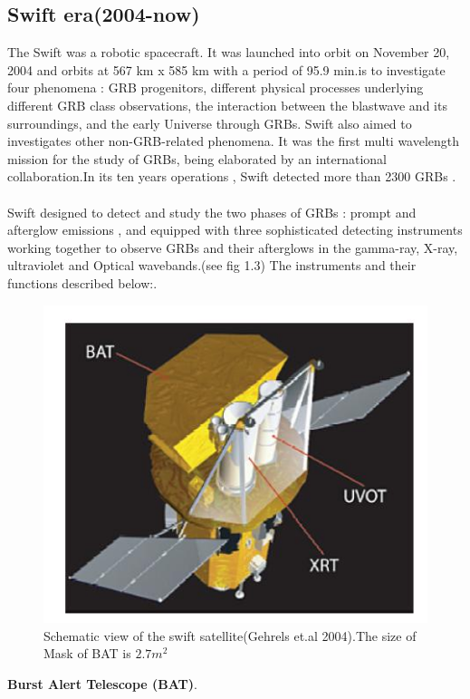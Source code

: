 \subsection{Swift era(2004-now)}
The Swift was a robotic spacecraft. It was launched into orbit on November 20, 2004 
and  orbits at 567 km x 585 km with a period of 95.9 min.is to investigate four phenomena : GRB progenitors, different physical processes underlying different GRB class observations, the interaction between the blastwave and its surroundings, and the early Universe through GRBs. Swift also aimed to investigates other non-GRB-related phenomena. It was the first multi wavelength mission for the study of GRBs, being elaborated by an international collaboration.In its ten years operations , Swift detected more than 2300 GRBs \citep{4} \citep{6}.\\\\
Swift designed to detect and study the two phases of GRBs : prompt and afterglow emissions , and equipped with  three sophisticated detecting instruments working together to observe GRBs and their afterglows in the gamma-ray, X-ray, ultraviolet and Optical wavebands.(see fig 1.3) The  instruments and their functions described below:\citep{8}\cite{9}.\\
\begin{figure}[h]
\begin{center}
\includegraphics[scale=0.4]{Figures/fig3.png}
\caption{Schematic view of the swift satellite(Gehrels et.al 2004).The size of Mask of BAT is $2.7m^{2}$  \citep{7}} 
\end{center}
\end{figure}
\textbf{Burst Alert Telescope (BAT)}.\\
